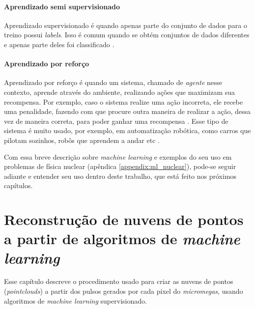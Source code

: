 \documentclass[a4paper,12pt,oneside]{book}
\begin{document}
\subsubsection*{Aprendizado semi supervisionado}

\par Aprendizado supervisionado é quando apenas parte do conjunto de dados para o treino possui \textit{labels}. Isso é comum quando se obtém conjuntos de dados diferentes e apenas parte deles foi classificado \cite{semi_supervised}.

\subsubsection*{Aprendizado por reforço}

\par Aprendizado por reforço é quando um sistema, chamado de \textit{agente} nesse contexto, aprende através do ambiente, realizando ações que maximizam sua recompensa. Por exemplo, caso o sistema realize uma ação incorreta, ele recebe uma penalidade, fazendo com que procure outra maneira de realizar a ação, dessa vez de maneira correta, para poder ganhar uma recompensa \cite{reinforcement}. Esse tipo de sistema é muito usado, por exemplo, em automatização robótica, como carros que pilotam sozinhos, robôs que aprendem a andar etc \cite{robot_ml}.



\par Com essa breve descrição sobre \textit{machine learning} e exemplos do seu uso em problemas de física nuclear (apêndica \ref{appendix:ml_nuclear}), pode-se seguir adiante e entender seu uso dentro deste trabalho, que está feito nos próximos capítulos.

\chapter{Reconstrução de nuvens de pontos a partir de algoritmos de \textit{machine learning}}\label{chapter:sinais}

\par Esse capítulo descreve o procedimento usado para criar as nuvens de pontos (\textit{pointclouds}) a partir dos pulsos gerados por cada pixel do \textit{micromegas}, usando algoritmos de \textit{machine learning} supervisionado.
\end{document}
